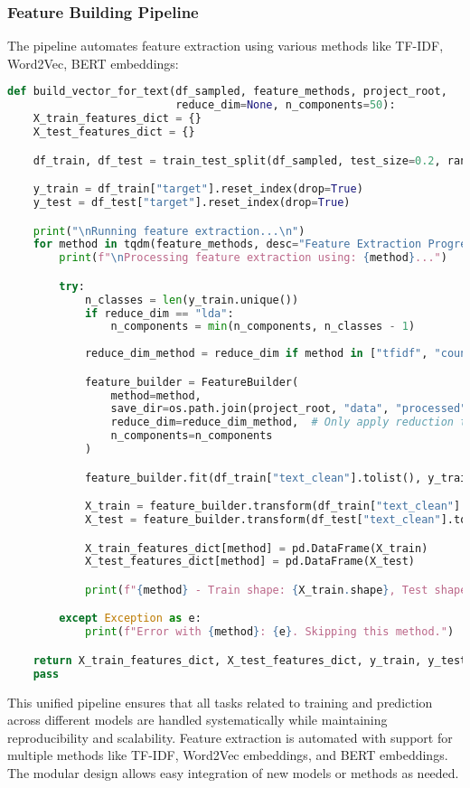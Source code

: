 \subsubsection{Feature Building Pipeline}
The pipeline automates feature extraction using various methods like TF-IDF, Word2Vec, BERT embeddings:

\begin{lstlisting}[language=python,caption={Feature Building Pipeline},label={lst:features}]
def build_vector_for_text(df_sampled, feature_methods, project_root,
                          reduce_dim=None, n_components=50):
    X_train_features_dict = {}
    X_test_features_dict = {}

    df_train, df_test = train_test_split(df_sampled, test_size=0.2, random_state=42, stratify=df_sampled["target"])

    y_train = df_train["target"].reset_index(drop=True)
    y_test = df_test["target"].reset_index(drop=True)

    print("\nRunning feature extraction...\n")
    for method in tqdm(feature_methods, desc="Feature Extraction Progress"):
        print(f"\nProcessing feature extraction using: {method}...")

        try:
            n_classes = len(y_train.unique())
            if reduce_dim == "lda":
                n_components = min(n_components, n_classes - 1)
                
            reduce_dim_method = reduce_dim if method in ["tfidf", "count", "binary_count"] else None

            feature_builder = FeatureBuilder(
                method=method,
                save_dir=os.path.join(project_root, "data", "processed"),
                reduce_dim=reduce_dim_method,  # Only apply reduction to vector-based methods
                n_components=n_components
            )

            feature_builder.fit(df_train["text_clean"].tolist(), y_train if reduce_dim == "lda" else None)

            X_train = feature_builder.transform(df_train["text_clean"].tolist(), n_classes if reduce_dim == "lda" else None)
            X_test = feature_builder.transform(df_test["text_clean"].tolist())

            X_train_features_dict[method] = pd.DataFrame(X_train)
            X_test_features_dict[method] = pd.DataFrame(X_test)

            print(f"{method} - Train shape: {X_train.shape}, Test shape: {X_test.shape}")

        except Exception as e:
            print(f"Error with {method}: {e}. Skipping this method.")

    return X_train_features_dict, X_test_features_dict, y_train, y_test
    pass  
\end{lstlisting}

This unified pipeline ensures that all tasks related to training and prediction across different models are handled systematically while maintaining reproducibility and scalability. Feature extraction is automated with support for multiple methods like TF-IDF, Word2Vec embeddings, and BERT embeddings. The modular design allows easy integration of new models or methods as needed.


